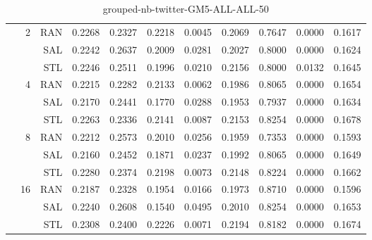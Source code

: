 \begin{center}
\begin{table}[htbp]
\begin{tabular}{ | r | r | r | r | r | r | r | r | r | r | r |}
 & \multirow{3}{*}{2} & RAN & 0.2268 & 0.2327 & 0.2218 & 0.0045 & 0.2069 & 0.7647 & 0.0000 & 0.1617\\ \cline{3-11}
 &   & SAL & 0.2242 & 0.2637 & 0.2009 & 0.0281 & 0.2027 & 0.8000 & 0.0000 & 0.1624\\ \cline{3-11}
 &   & STL & 0.2246 & 0.2511 & 0.1996 & 0.0210 & 0.2156 & 0.8000 & 0.0132 & 0.1645\\ \cline{2-11}
 & \multirow{3}{*}{4} & RAN & 0.2215 & 0.2282 & 0.2133 & 0.0062 & 0.1986 & 0.8065 & 0.0000 & 0.1654\\ \cline{3-11}
 &   & SAL & 0.2170 & 0.2441 & 0.1770 & 0.0288 & 0.1953 & 0.7937 & 0.0000 & 0.1634\\ \cline{3-11}
 &   & STL & 0.2263 & 0.2336 & 0.2141 & 0.0087 & 0.2153 & 0.8254 & 0.0000 & 0.1678\\ \cline{2-11}
 & \multirow{3}{*}{8} & RAN & 0.2212 & 0.2573 & 0.2010 & 0.0256 & 0.1959 & 0.7353 & 0.0000 & 0.1593\\ \cline{3-11}
 &   & SAL & 0.2160 & 0.2452 & 0.1871 & 0.0237 & 0.1992 & 0.8065 & 0.0000 & 0.1649\\ \cline{3-11}
 &   & STL & 0.2280 & 0.2374 & 0.2198 & 0.0073 & 0.2148 & 0.8224 & 0.0000 & 0.1662\\ \cline{2-11}
 & \multirow{3}{*}{16} & RAN & 0.2187 & 0.2328 & 0.1954 & 0.0166 & 0.1973 & 0.8710 & 0.0000 & 0.1596\\ \cline{3-11}
 &   & SAL & 0.2240 & 0.2608 & 0.1540 & 0.0495 & 0.2010 & 0.8254 & 0.0000 & 0.1653\\ \cline{3-11}
 &   & STL & 0.2308 & 0.2400 & 0.2226 & 0.0071 & 0.2194 & 0.8182 & 0.0000 & 0.1674\\ \cline{2-11}
\hline
\end{tabular}
\caption{grouped-nb-twitter-GM5-ALL-ALL-50}
\end{table}
\end{center}

